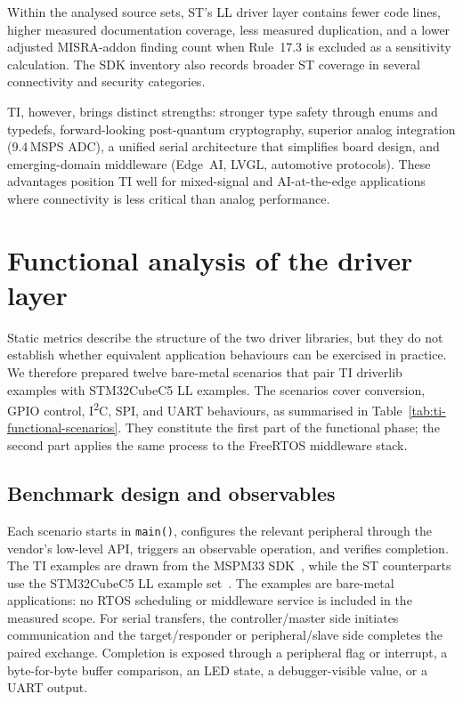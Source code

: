 Within the analysed source sets, ST's LL driver layer contains fewer code lines, higher
measured documentation coverage, less measured duplication, and a lower adjusted
MISRA-addon finding count when Rule~17.3 is excluded as a sensitivity calculation. The SDK
inventory also records broader ST coverage in several connectivity and security categories.

TI, however, brings distinct strengths: stronger type safety through enums and typedefs,
forward-looking post-quantum cryptography, superior analog integration (9.4\,MSPS ADC), a
unified serial architecture that simplifies board design, and emerging-domain middleware
(Edge~AI, LVGL, automotive protocols). These advantages position TI well for mixed-signal
and AI-at-the-edge applications where connectivity is less critical than analog performance.
\section{Functional analysis of the driver layer}
\label{sec:ti-functional-analysis}

Static metrics describe the structure of the two driver libraries, but they do not establish
whether equivalent application behaviours can be exercised in practice. We therefore prepared
twelve bare-metal scenarios that pair TI driverlib examples with STM32CubeC5 LL examples. The
scenarios cover conversion, GPIO control, I\textsuperscript{2}C, SPI, and UART behaviours, as
summarised in Table~\ref{tab:ti-functional-scenarios}. They constitute the first part of the
functional phase; the second part applies the same process to the FreeRTOS middleware stack.

\subsection{Benchmark design and observables}
\label{subsec:ti-functional-design}

Each scenario starts in \texttt{main()}, configures the relevant peripheral through the vendor's
low-level API, triggers an observable operation, and verifies completion. The TI examples are
drawn from the MSPM33 SDK~\cite{ti-mspm33-sdk}, while the ST counterparts use the
STM32CubeC5 LL example set~\cite{stm32cubec5-sw}. The examples are
bare-metal applications: no RTOS scheduling or middleware service is included in the measured
scope. For serial transfers, the controller/master side initiates communication and the
target/responder or peripheral/slave side completes the paired exchange. Completion is exposed
through a peripheral flag or interrupt, a byte-for-byte buffer comparison, an LED state, a
debugger-visible value, or a UART output.

